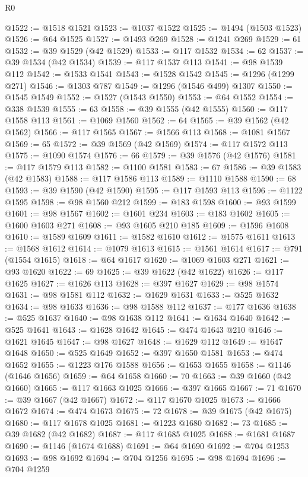 \begin{lexlean}{R0}
\begin{coremodule}
@1522 := @1518 @1521
@1523 := @1037 @1522
@1525 := @1494 (@1503 @1523)
@1526 := @64 @1525
@1527 := @1493 @269
@1528 := @1241 @269
@1529 := 61
@1532 := @39 @1529 (@42 @1529)
@1533 := @117 @1532
@1534 := 62
@1537 := @39 @1534 (@42 @1534)
@1539 := @117 @1537 @113
@1541 := @98 @1539 @112
@1542 := @1533 @1541
@1543 := @1528 @1542
@1545 := @1296 (@1299 @271)
@1546 := @1303 @787
@1549 := @1296 (@1546 @499) @1307
@1550 := @1545 @1549
@1552 := @1527 (@1543 @1550)
@1553 := @64 @1552
@1554 := @338 @1539
@1555 := 63
@1558 := @39 @1555 (@42 @1555)
@1560 := @117 @1558 @113
@1561 := @1069 @1560
@1562 := 64
@1565 := @39 @1562 (@42 @1562)
@1566 := @117 @1565
@1567 := @1566 @113
@1568 := @1081 @1567
@1569 := 65
@1572 := @39 @1569 (@42 @1569)
@1574 := @117 @1572 @113
@1575 := @1090 @1574
@1576 := 66
@1579 := @39 @1576 (@42 @1576)
@1581 := @117 @1579 @113
@1582 := @1100 @1581
@1583 := 67
@1586 := @39 @1583 (@42 @1583)
@1588 := @117 @1586 @113
@1589 := @1110 @1588
@1590 := 68
@1593 := @39 @1590 (@42 @1590)
@1595 := @117 @1593 @113
@1596 := @1122 @1595
@1598 := @98 @1560 @212
@1599 := @183 @1598
@1600 := @93 @1599
@1601 := @98 @1567
@1602 := @1601 @234
@1603 := @183 @1602
@1605 := @1600 @1603 @271
@1608 := @93 @1605 @210 @185
@1609 := @1596 @1608
@1610 := @1589 @1609
@1611 := @1582 @1610
@1612 := @1575 @1611
@1613 := @1568 @1612
@1614 := @1079 @1613
@1615 := @1561 @1614
@1617 := @791 (@1554 @1615)
@1618 := @64 @1617
@1620 := @1069 @1603 @271
@1621 := @93 @1620
@1622 := 69
@1625 := @39 @1622 (@42 @1622)
@1626 := @117 @1625
@1627 := @1626 @113
@1628 := @397 @1627
@1629 := @98 @1574
@1631 := @98 @1581 @112
@1632 := @1629 @1631
@1633 := @525 @1632
@1634 := @98 @1633
@1636 := @98 @1588 @112
@1637 := @177 @1636
@1638 := @525 @1637
@1640 := @98 @1638 @112
@1641 := @1634 @1640
@1642 := @525 @1641
@1643 := @1628 @1642
@1645 := @474 @1643 @210
@1646 := @1621 @1645
@1647 := @98 @1627
@1648 := @1629 @112
@1649 := @1647 @1648
@1650 := @525 @1649
@1652 := @397 @1650 @1581
@1653 := @474 @1652
@1655 := @1223 @176 @1588
@1656 := @1653 @1655
@1658 := @1146 (@1646 @1656)
@1659 := @64 @1658
@1660 := 70
@1663 := @39 @1660 (@42 @1660)
@1665 := @117 @1663 @1025
@1666 := @397 @1665
@1667 := 71
@1670 := @39 @1667 (@42 @1667)
@1672 := @117 @1670 @1025
@1673 := @1666 @1672
@1674 := @474 @1673
@1675 := 72
@1678 := @39 @1675 (@42 @1675)
@1680 := @117 @1678 @1025
@1681 := @1223 @1680
@1682 := 73
@1685 := @39 @1682 (@42 @1682)
@1687 := @117 @1685 @1025
@1688 := @1681 @1687
@1690 := @1146 (@1674 @1688)
@1691 := @64 @1690
@1692 := @704 @1253
@1693 := @98 @1692
@1694 := @704 @1256
@1695 := @98 @1694
@1696 := @704 @1259

\end{coremodule}
\end{lexlean}
